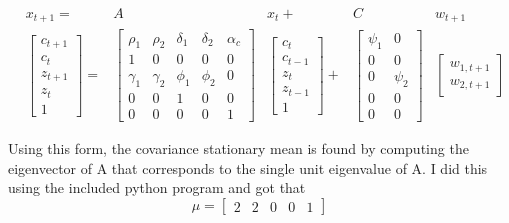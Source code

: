 \documentclass{homework}
\begin{document}
\begin{homeworkProblem}[Problem 2.6]
{\begin{enumerate}[a.]
        \begin{align*}
            &x_{t+1} = &A &x_t + &C &w_{t+1} \\
            &\left[\begin{matrix} c_{t+1} \\ c_{t} \\ z_{t+1} \\ z_{t} \\ 1 \end{matrix}\right] =
              &\begin{bmatrix}  %
               \rho_1 & \rho_2 & \delta_1 & \delta_2 &  \alpha_c \\
               1 & 0 & 0 & 0 & 0 \\
               \gamma_1 & \gamma_2 & \phi_1 & \phi_2 & 0 \\
               0 & 0 & 1 & 0 & 0 \\
               0 & 0 & 0 & 0 & 1
               \end{bmatrix}
               &\left[\begin{matrix} c_t \\ c_{t-1} \\ z_t \\ z_{t-1} \\ 1 \end{matrix}\right] %
               +
               &\begin{bmatrix} %
               \psi_1 & 0 \\
               0 & 0 \\
              0 & \psi_2 \\
              0 & 0 \\
              0 & 0
              \end{bmatrix}
              &\begin{bmatrix} %
                w_{1, t+1}\\
                w_{2, t+1}
              \end{bmatrix}
          \end{align*}

          Using this form, the covariance stationary mean is found by computing the eigenvector of A that corresponds to the single unit eigenvalue of A. I did this using the included python program and got that
          $$\mu = \begin{bmatrix}2 & 2 & 0 & 0 & 1\end{bmatrix}$$


\end{enumerate}}
\end{homeworkProblem}
\end{document}
